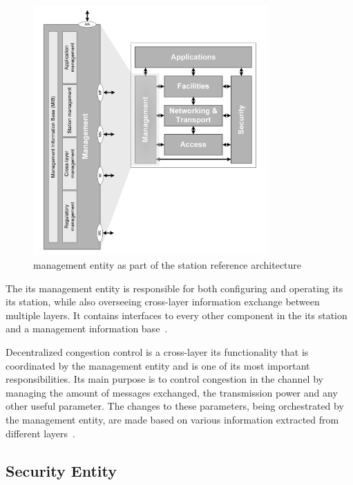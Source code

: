 \begin{figure}[htbp]
\centering
\includegraphics[width=0.8\textwidth]{Chapters/Figures/VANETs/management_entity.png}
   	\caption{ management entity as part of the  station reference architecture~\cite{etsi_intelligent_2010}}
   	\label{fig:management_entity}
\end{figure}


The \gls{its} management entity is responsible for both configuring and operating its \gls{its} station, while also overseeing cross-layer information exchange between multiple layers. It contains interfaces to every other component in the \gls{its} station and a management information base~\cite{etsi_intelligent_2014}. 

Decentralized congestion control is a cross-layer \gls{its} functionality that is coordinated by the management entity and is one of its most important responsibilities. Its main purpose is to control congestion in the channel by managing the amount of messages exchanged, the transmission power and any other useful parameter. The changes to these parameters, being orchestrated by the management entity, are made based on various information extracted from different layers~\cite{festag_cooperative_2014}.



\subsection[Security Entity]{Security Entity}

